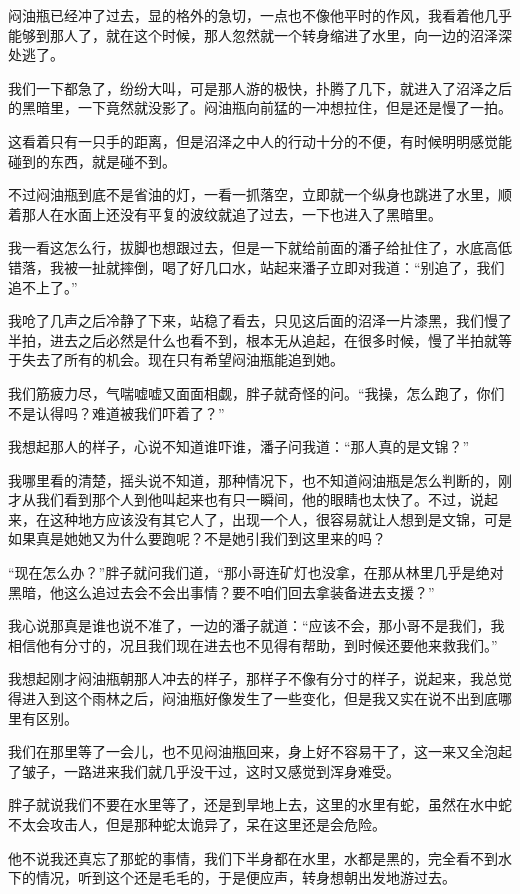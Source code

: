 闷油瓶已经冲了过去，显的格外的急切，一点也不像他平时的作风，我看着他几乎能够到那人了，就在这个时候，那人忽然就一个转身缩进了水里，向一边的沼泽深处逃了。

我们一下都急了，纷纷大叫，可是那人游的极快，扑腾了几下，就进入了沼泽之后的黑暗里，一下竟然就没影了。闷油瓶向前猛的一冲想拉住，但是还是慢了一拍。

这看着只有一只手的距离，但是沼泽之中人的行动十分的不便，有时候明明感觉能碰到的东西，就是碰不到。

不过闷油瓶到底不是省油的灯，一看一抓落空，立即就一个纵身也跳进了水里，顺着那人在水面上还没有平复的波纹就追了过去，一下也进入了黑暗里。

我一看这怎么行，拔脚也想跟过去，但是一下就给前面的潘子给扯住了，水底高低错落，我被一扯就摔倒，喝了好几口水，站起来潘子立即对我道：“别追了，我们追不上了。”

我呛了几声之后冷静了下来，站稳了看去，只见这后面的沼泽一片漆黑，我们慢了半拍，进去之后必然是什么也看不到，根本无从追起，在很多时候，慢了半拍就等于失去了所有的机会。现在只有希望闷油瓶能追到她。

我们筋疲力尽，气喘嘘嘘又面面相觑，胖子就奇怪的问。“我操，怎么跑了，你们不是认得吗？难道被我们吓着了？”

我想起那人的样子，心说不知道谁吓谁，潘子问我道：“那人真的是文锦？”

我哪里看的清楚，摇头说不知道，那种情况下，也不知道闷油瓶是怎么判断的，刚才从我们看到那个人到他叫起来也有只一瞬间，他的眼睛也太快了。不过，说起来，在这种地方应该没有其它人了，出现一个人，很容易就让人想到是文锦，可是如果真是她她又为什么要跑呢？不是她引我们到这里来的吗？

“现在怎么办？”胖子就问我们道，“那小哥连矿灯也没拿，在那从林里几乎是绝对黑暗，他这么追过去会不会出事情？要不咱们回去拿装备进去支援？”

我心说那真是谁也说不准了，一边的潘子就道：“应该不会，那小哥不是我们，我相信他有分寸的，况且我们现在进去也不见得有帮助，到时候还要他来救我们。”

我想起刚才闷油瓶朝那人冲去的样子，那样子不像有分寸的样子，说起来，我总觉得进入到这个雨林之后，闷油瓶好像发生了一些变化，但是我又实在说不出到底哪里有区别。

我们在那里等了一会儿，也不见闷油瓶回来，身上好不容易干了，这一来又全泡起了皱子，一路进来我们就几乎没干过，这时又感觉到浑身难受。

胖子就说我们不要在水里等了，还是到旱地上去，这里的水里有蛇，虽然在水中蛇不太会攻击人，但是那种蛇太诡异了，呆在这里还是会危险。

他不说我还真忘了那蛇的事情，我们下半身都在水里，水都是黑的，完全看不到水下的情况，听到这个还是毛毛的，于是便应声，转身想朝出发地游过去。

